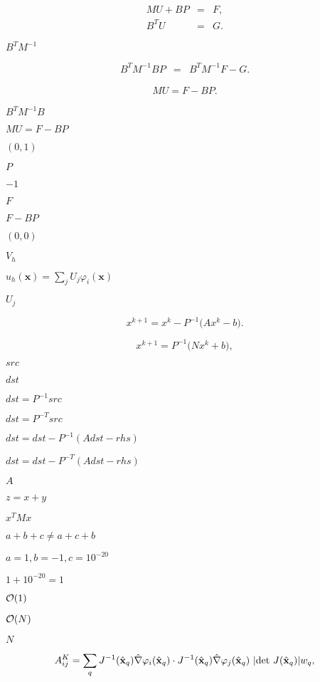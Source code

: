 \documentclass{article}
\begin{document}
\begin{eqnarray*} MU + BP &=& F,\\ B^TU &=& G. \end{eqnarray*}
\pagebreak

$B^TM^{-1}$
\pagebreak

\begin{eqnarray*} B^TM^{-1}BP &=& B^TM^{-1}F-G. \end{eqnarray*}
\pagebreak

\begin{eqnarray*} MU = F-BP. \end{eqnarray*}
\pagebreak

$B^TM^{-1}B$
\pagebreak

$MU=F-BP$
\pagebreak

$(0,1)$
\pagebreak

$P$
\pagebreak

$-1$
\pagebreak

$F$
\pagebreak

$F-BP$
\pagebreak

$(0,0)$
\pagebreak

$V_h$
\pagebreak

$u_h(\mathbf x)= \sum_j U_j \varphi_i(\mathbf x)$
\pagebreak

$U_j$
\pagebreak

\[ x^{k+1} = x^k - P^{-1} \bigl(A x^k - b\bigr). \]
\pagebreak

\[ x^{k+1} = P^{-1} \bigl(N x^k + b\bigr), \]
\pagebreak

$src$
\pagebreak

$dst$
\pagebreak

$dst=P^{-1}src$
\pagebreak

$dst=P^{-T}src$
\pagebreak

$dst = dst - P^{-1} (A dst - rhs)$
\pagebreak

$dst = dst - P^{-T} (A dst - rhs)$
\pagebreak

$A$
\pagebreak

$z = x+y$
\pagebreak

$x^T M x$
\pagebreak

$a+b+c \neq a+c+b$
\pagebreak

$a=1, b=-1, c=10^{-20}$
\pagebreak

$1+10^{-20}=1$
\pagebreak

${\cal O}(1)$
\pagebreak

${\cal O}(N)$
\pagebreak

$N$
\pagebreak

\[ A^K_{ij} = \sum_{q}J^{-1}(\hat{\bf x}_q) \hat \nabla \varphi_i(\hat{\bf x}_q) \cdot J^{-1}(\hat{\bf x}_q) \hat \nabla \varphi_j(\hat{\bf x}_q)\ |\textrm{det}\ J(\hat{\bf x}_q)| w_q, \]
\pagebreak
\end{document}
